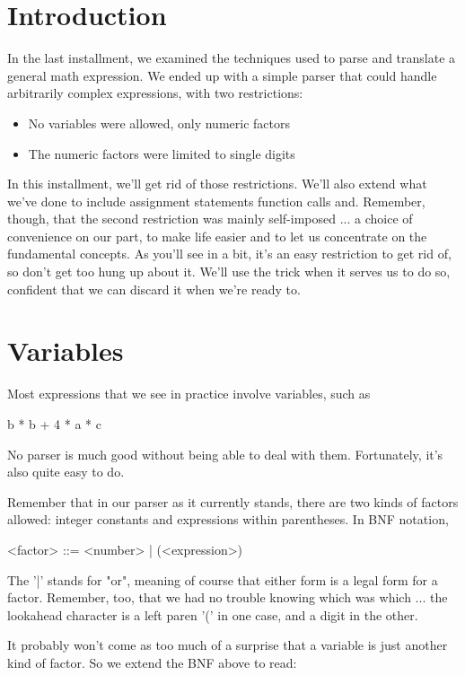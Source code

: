 \documentclass[float=false, crop=false]{standalone}
\begin{document}
\section{Introduction}

In the last installment, we examined the techniques used to parse and translate
a general math expression. We ended up with a simple parser that could handle
arbitrarily complex expressions, with two restrictions:

\begin{itemize}
\item No variables were allowed, only numeric factors

\item The numeric factors were limited to single digits
\end{itemize}

In this installment, we'll get rid of those restrictions. We'll also extend what
we've done to include assignment statements function calls and. Remember,
though, that the second restriction was mainly self-imposed ... a choice of
convenience on our part, to make life easier and to let us concentrate on the
fundamental concepts. As you'll see in a bit, it's an easy restriction to get
rid of, so don't get too hung up about it. We'll use the trick when it serves us
to do so, confident that we can discard it when we're ready to.


\section{Variables}

Most expressions that we see in practice involve variables, such as

               b * b + 4 * a * c

No parser is much good without being able to deal with them. Fortunately, it's
also quite easy to do.

Remember that in our parser as it currently stands, there are two kinds of
factors allowed: integer constants and expressions within parentheses. In BNF
notation,

     <factor> ::= <number> | (<expression>)

The '|' stands for "or", meaning of course that either form is a legal form for
a factor. Remember, too, that we had no trouble knowing which was which ... the
lookahead character is a left paren '(' in one case, and a digit in the other.

It probably won't come as too much of a surprise that a variable is just another
kind of factor. So we extend the BNF above to read:
\end{document}
